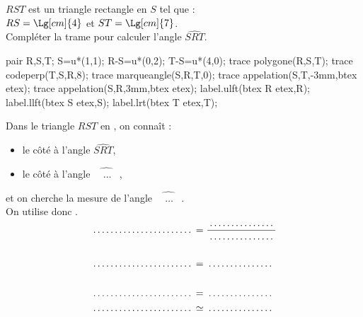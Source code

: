\begin{exercice*}
    $RST$ est un triangle rectangle en $S$ tel que :\\$RS=\Lg[cm]{4}$ et $ST=\Lg[cm]{7}$.\\
    Compléter la trame pour calculer l'angle $\widehat{SRT}$.
    \begin{center}
        \begin{Geometrie}[CoinHD={(5.5u,3.5u)}]        
            pair R,S,T;
            S=u*(1,1);
            R-S=u*(0,2);
            T-S=u*(4,0);
            trace polygone(R,S,T);
            trace codeperp(T,S,R,8);
            trace marqueangle(S,R,T,0);
            trace appelation(S,T,-3mm,btex  etex);
            trace appelation(S,R,3mm,btex  etex);
            label.ulft(btex R etex,R);
            label.llft(btex S etex,S);
            label.lrt(btex T etex,T);
        \end{Geometrie}
    \end{center}
    Dans le triangle $RST$ \makebox[0.4\linewidth]{\dotfill} en \makebox[0.1\linewidth]{\dotfill}, on connaît :
    \begin{itemize}        
        \item le côté \makebox[0.3\linewidth]{\dotfill} à l'angle $\widehat{SRT}$,
        \item le côté \makebox[0.3\linewidth]{\dotfill} à l'angle $\widehat{\phantom{M}\dots\phantom{N}}$,
    \end{itemize}
    et on cherche la mesure de l'angle $\widehat{\phantom{M}\dots\phantom{N}}$.\\ On utilise donc \makebox[0.2\linewidth]{\dotfill}.
    \begin{align*}
        \makebox[0.3\linewidth]{\dotfill}&=\frac{\makebox[0.2\linewidth]{\dotfill}}{\makebox[0.2\linewidth]{\dotfill}}\\
        &\\
        \makebox[0.3\linewidth]{\dotfill}&=\makebox[0.2\linewidth]{\dotfill}\\
        &\\        
        \makebox[0.3\linewidth]{\dotfill}&=\makebox[0.2\linewidth]{\dotfill}\\        
        \makebox[0.3\linewidth]{\dotfill}&\simeq\makebox[0.2\linewidth]{\dotfill}
    \end{align*}
\end{exercice*}
